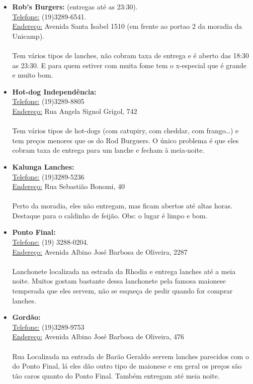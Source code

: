 \begin{itemize}
\item  \textbf{Rob's Burgers:} (entregas até as 23:30).
\\\underline{Telefone:} (19)3289-6541.
\\\underline{Endereço:} Avenida Santa Isabel 1510 (em frente ao portao 2 da moradia da Unicamp).
\\\\Tem vários tipos de lanches, não cobram taxa de entrega e é aberto das 18:30 as 23:30. E para quem estiver com muita fome tem o x-especial que é grande e muito bom.

\item  \textbf{Hot-dog Independência:}
\\\underline{Telefone:} (19)3289-8805
\\\underline{Endereço:} Rua Angela Signol Grigol, 742
\\\\Tem vários tipos de hot-dogs (com catupiry, com cheddar, com frango{\dots}) e tem preços menores que os do Rod Burguers. O único problema é que eles cobram taxa de entrega para um lanche e fecham à meia-noite.

\item  \textbf{Kalunga Lanches:}
\\\underline{Telefone:} (19)3289-5236
\\\underline{Endereço:} Rua Sebastião Bonomi, 40
\\\\Perto da moradia, eles não entregam, mas ficam abertos até altas horas. Destaque para o caldinho de feijão. Obs: o lugar é limpo e bom.

\item  \textbf{Ponto Final:}
\\\underline{Telefone:} (19) 3288-0204.
\\\underline{Endereço:} Avenida Albino José Barbosa de Oliveira, 2287
\\\\Lanchonete localizada na estrada da Rhodia e entrega lanches até a meia noite. Muitos gostam bastante dessa lanchonete pela famosa maionese temperada que eles servem, não se esqueça de pedir quando for comprar lanches.

\item  \textbf{Gordão:}
\\\underline{Telefone:} (19)3289-9753
\\\underline{Endereço:} Avenida Albino José Barbosa de Oliveira, 476
\\\\Rua Localizada na entrada de Barão Geraldo servem lanches parecidos com o do Ponto Final, lá eles dão outro tipo de maionese e em geral os preços são tão caros quanto do Ponto Final. Também entregam até meia noite.


\end{itemize}
